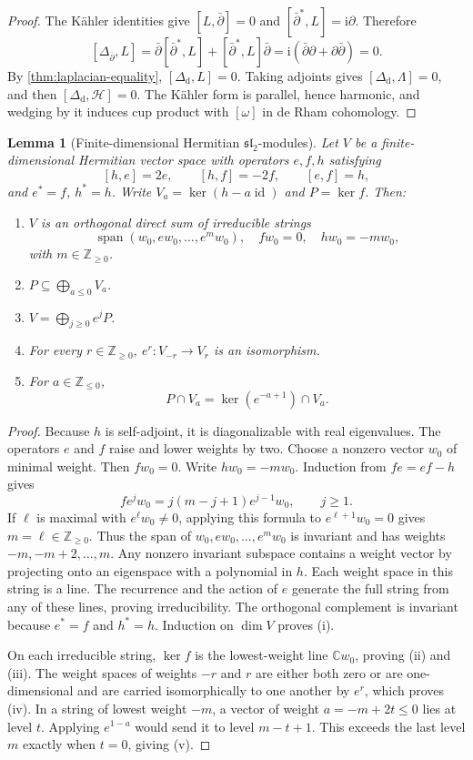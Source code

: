 \documentclass[11pt,reqno]{amsart}
\newtheorem{lemma}[theorem]{Lemma}
\theoremstyle{definition}
\theoremstyle{remark}
\newcommand{\C}{\mathbb{C}}
\newcommand{\Z}{\mathbb{Z}}
\newcommand{\dd}{\mathrm{d}}
\newcommand{\ii}{\mathrm{i}}
\newcommand{\dbar}{\bar\partial}
\DeclareMathOperator{\id}{id}
\begin{document}
\begin{proof}
The K\"ahler identities give $[L,\dbar]=0$ and
$[\dbar^*,L]=\ii\partial$. Therefore
\[
[\Delta_{\dbar},L]
=\dbar[\dbar^*,L]+[\dbar^*,L]\dbar
=\ii(\dbar\partial+\partial\dbar)=0.
\]
By \cref{thm:laplacian-equality}, $[\Delta_\dd,L]=0$. Taking adjoints gives
$[\Delta_\dd,\Lambda]=0$, and then $[\Delta_\dd,\mathcal H]=0$. The K\"ahler
form is parallel, hence harmonic, and wedging by it induces cup product with
$[\omega]$ in de Rham cohomology.
\end{proof}

\begin{lemma}[Finite-dimensional Hermitian $\mathfrak{sl}_2$-modules]
\label{lem:sl2-module}
Let $V$ be a finite-dimensional Hermitian vector space with operators $e,f,h$
satisfying
\[
[h,e]=2e,
\qquad
[h,f]=-2f,
\qquad
[e,f]=h,
\]
and $e^*=f$, $h^*=h$. Write $V_a=\ker(h-a\id)$ and $P=\ker f$. Then:
\begin{enumerate}
  \item $V$ is an orthogonal direct sum of irreducible strings
  \[
  \operatorname{span}(w_0,ew_0,\dots,e^mw_0),
  \quad
  fw_0=0,
  \quad
  hw_0=-mw_0,
  \]
  with $m\in\Z_{\geq0}$.
  \item $P\subseteq\bigoplus_{a\leq0}V_a$.
  \item $V=\bigoplus_{j\geq0}e^jP$.
  \item For every $r\in\Z_{\geq0}$, $e^r:V_{-r}\to V_r$ is an isomorphism.
  \item For $a\in\Z_{\leq0}$,
  \[
  P\cap V_a=\ker(e^{-a+1})\cap V_a.
  \]
\end{enumerate}
\end{lemma}

\begin{proof}
Because $h$ is self-adjoint, it is diagonalizable with real eigenvalues. The
operators $e$ and $f$ raise and lower weights by two. Choose a nonzero vector
$w_0$ of minimal weight. Then $fw_0=0$. Write $hw_0=-mw_0$. Induction from
$fe=ef-h$ gives
\[
f e^j w_0=j(m-j+1)e^{j-1}w_0,\qquad j\geq1.
\]
If $\ell$ is maximal with $e^\ell w_0\neq0$, applying this formula to
$e^{\ell+1}w_0=0$ gives $m=\ell\in\Z_{\geq0}$. Thus the span of
$w_0,ew_0,\dots,e^mw_0$ is invariant and has weights
$-m,-m+2,\dots,m$. Any nonzero invariant subspace contains a weight vector
by projecting onto an eigenspace with a polynomial in $h$. Each weight
space in this string is a line. The recurrence and the action of $e$
generate the full string from any of these lines, proving irreducibility.
The orthogonal complement is invariant because $e^*=f$ and $h^*=h$.
Induction on $\dim V$ proves (i).

On each irreducible string, $\ker f$ is the lowest-weight line $\C w_0$,
proving (ii) and (iii). The weight spaces of weights $-r$ and $r$ are either
both zero or are one-dimensional and are carried isomorphically to one another
by $e^r$, which proves (iv). In a string of lowest weight $-m$, a vector
of weight $a=-m+2t\leq0$ lies at level $t$. Applying $e^{1-a}$ would
send it to level $m-t+1$. This exceeds the last level $m$ exactly when
$t=0$, giving (v).
\end{proof}
\end{document}
